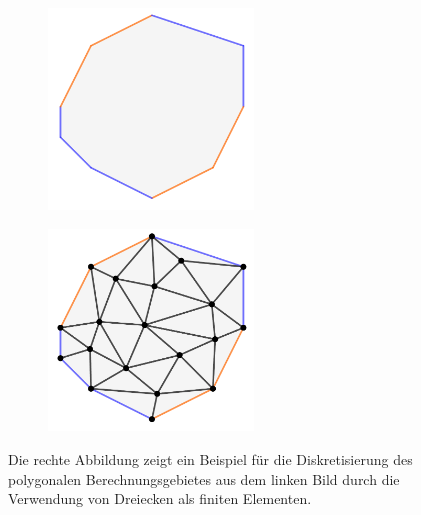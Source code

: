 \documentclass[crop=false]{standalone}
\begin{document}
        \begin{figure}[h]
          \begin{subfigure}[b]{0.5\textwidth}
            \center
            \includegraphics[width=0.6\textwidth]{images/domain_discretization_1.pdf}
          \end{subfigure}
          \begin{subfigure}[b]{0.5\textwidth}
            \center
            \includegraphics[width=0.6\textwidth]{images/domain_discretization_2.pdf}
          \end{subfigure}
          \caption{%
            Die rechte Abbildung zeigt ein Beispiel für die Diskretisierung des polygonalen Berechnungsgebietes aus dem linken Bild durch die Verwendung von Dreiecken als finiten Elementen.%
          }
          \label{fig:domain-discretization}
        \end{figure}
\end{document}
